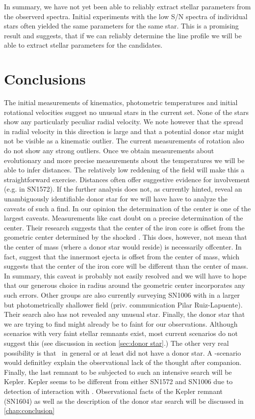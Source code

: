 In summary, we have not yet been able to reliably extract stellar parameters from the observerd spectra. Initial experiments with the low S/N spectra of individual stars often yielded the same parameters for the same star. This is a promising result and suggests, that if we can reliably determine the line profile we will be able to extract stellar parameters for the candidates.


\section{Conclusions}

The initial measurements of kinematics, photometric temperatures and initial rotational velocities suggest no unusual stars in the current set. None of the stars show any particularly peculiar radial velocity. We note however that the spread in radial velocity in this direction is large and that a potential donor star might not be visible as a kinematic outlier. The current measurements of rotation also do not show any strong outliers.
Once we obtain measurements about evolutionary and more precise measurements about the temperatures we will be able to infer distances. The relatively low reddening of the field will make this a straightforward exercise. Distances often offer suggestive evidence for involvement (e.g. \starg in SN1572). If the further analysis does not, as currently hinted, reveal an unambiguously identifiable donor star for  we will have have to analyze the caveats of such a find. In our opinion the determination of the center is one of the largest caveats. Measurements like \citet{2005ApJ...624..189W} cast doubt on a precise determination of the center. Their research suggests that the center of the iron core is offset from the geometric center determined by the shocked \ism. This does, however, not mean that the center of mass (where a donor star would reside) is necessarily offcenter. In fact, \cite{2010ApJ...708.1703M} suggest that the innermost ejecta is offset from the center of mass, which suggests that the center of the iron core will be different than the center of mass. In summary, this caveat is probably not easily resolved and we will have to hope that our generous choice in radius around the geometric center incorporates any such errors. Other groups are also currently surveying SN1006 with in a larger but photometrically shallower field (priv. communication Pilar Ruiz-Lapuente). Their search also has not revealed any unusual star. Finally, the donor star that we are trying to find might already be to faint for our observations. Although scenarios with very faint stellar remnants exist, most current scenarios do not suggest this (see discussion in section \ref{sec:donor star}.) The other very real possibility is that \sneia\ in general or at least  did not have a donor star. A \dd-scenario would definitley explain the observational lack of the thought after companion. 
Finally, the last remnant to be subjected to such an intensive search will be Kepler. Kepler seems to be different from either SN1572 and SN1006 due to detection of interaction with \csm. Observational facts of the Kepler remnant (SN1604) as well as the description of the donor star search will be discussed in \ref{chap:conclusion}


